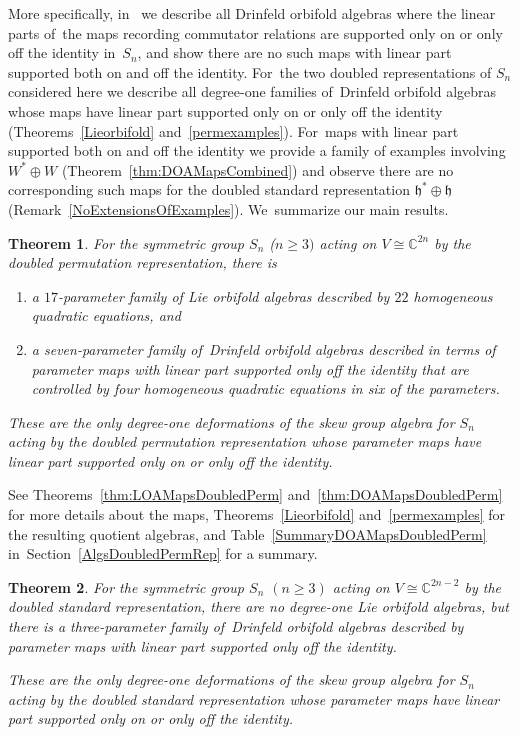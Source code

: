 \documentclass[10pt,a4paper]{amsart}
\numberwithin{equation}{section}
\newtheorem{Theorem}{Theorem}[section]
\begin{document}
More specifically, in~\cite{FGK} we describe all Drinfeld orbifold algebras
where the linear parts of~the maps recording commutator relations are supported only
on or only off the identity in~$S_n$, and show there are no such maps with
linear part supported both on and off the identity. For~the two
doubled representations of $S_n$ considered here we describe all degree-one
families of~Drinfeld orbifold algebras whose maps have linear part supported only on
or only off the identity (Theorems~\ref{Lieorbifold} and~\ref{permexamples}). For~maps with linear part supported both on and off the identity
we provide a family of examples involving $W^*\oplus W$
(Theorem~\ref{thm:DOAMapsCombined})
and observe there are no corresponding such maps for
the doubled standard representation $\mathfrak{h}^*\oplus \mathfrak{h}$
(Remark~\ref{NoExtensionsOfExamples}). We~summarize our main results.
\begin{Theorem}\label{thA}
For the symmetric group $S_n$ ($n\geq 3)$ acting on $V \cong \mathbb{C}^{2n}$
by the doubled permutation representation, there is
\begin{enumerate}\itemsep=0pt
\item[$(1)$] a $17$-parameter family of Lie orbifold algebras described by $22$
homogeneous quadratic equations, and
\item[$(2)$] a seven-parameter family of~Drinfeld orbifold algebras described in terms
of parameter maps with linear part supported only off the identity that are
controlled by four homogeneous quadratic equations in six of the parameters.
\end{enumerate}
These are the only degree-one deformations of the skew group algebra for $S_n$
acting by the doubled permutation representation whose
parameter maps have linear part supported only on or only off the identity.
\end{Theorem}
See Theorems~\ref{thm:LOAMapsDoubledPerm} and~\ref{thm:DOAMapsDoubledPerm}
for more details about the maps, Theorems~\ref{Lieorbifold} and~\ref{permexamples}
for the resulting quotient algebras, and Table~\ref{SummaryDOAMapsDoubledPerm}
in~Section~\ref{AlgsDoubledPermRep} for a summary.


\begin{Theorem}\label{thB}For the symmetric group $S_n$ $(n\geq 3)$ acting on $V \cong \mathbb{C}^{2n-2}$ by the
doubled standard representation, there are no degree-one Lie orbifold algebras,
but there is a three-parameter family of~Drinfeld orbifold algebras described by
parameter maps with linear part supported only off the identity.

These are the only degree-one deformations of the skew group algebra for $S_n$
acting by the doubled standard representation whose
parameter maps have linear part supported only on or only off the identity.
\end{Theorem}
\end{document}
